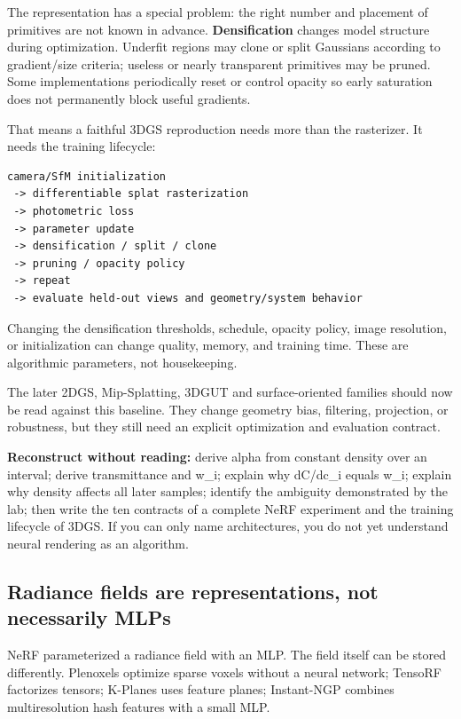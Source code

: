 The representation has a special problem: the right number and placement of primitives are not known in advance. \textbf{Densification} changes model structure during optimization. Underfit regions may clone or split Gaussians according to gradient/size criteria; useless or nearly transparent primitives may be pruned. Some implementations periodically reset or control opacity so early saturation does not permanently block useful gradients.

That means a faithful 3DGS reproduction needs more than the rasterizer. It needs the training lifecycle:

\begin{verbatim}
camera/SfM initialization
 -> differentiable splat rasterization
 -> photometric loss
 -> parameter update
 -> densification / split / clone
 -> pruning / opacity policy
 -> repeat
 -> evaluate held-out views and geometry/system behavior
\end{verbatim}

Changing the densification thresholds, schedule, opacity policy, image resolution, or initialization can change quality, memory, and training time. These are algorithmic parameters, not housekeeping.

The later 2DGS, Mip-Splatting, 3DGUT and surface-oriented families should now be read against this baseline. They change geometry bias, filtering, projection, or robustness, but they still need an explicit optimization and evaluation contract.

\textbf{Reconstruct without reading:} derive alpha from constant density over an interval; derive transmittance and w\_i; explain why dC/dc\_i equals w\_i; explain why density affects all later samples; identify the ambiguity demonstrated by the lab; then write the ten contracts of a complete NeRF experiment and the training lifecycle of 3DGS. If you can only name architectures, you do not yet understand neural rendering as an algorithm.

\subsection{Radiance fields are representations, not necessarily MLPs}\label{04-visual-computing-ii-ch035-radiance-fields-are-representations-not-necessarily-mlps}

NeRF parameterized a radiance field with an MLP. The field itself can be stored differently. Plenoxels optimize sparse voxels without a neural network; TensoRF factorizes tensors; K-Planes uses feature planes; Instant-NGP combines multiresolution hash features with a small MLP.

